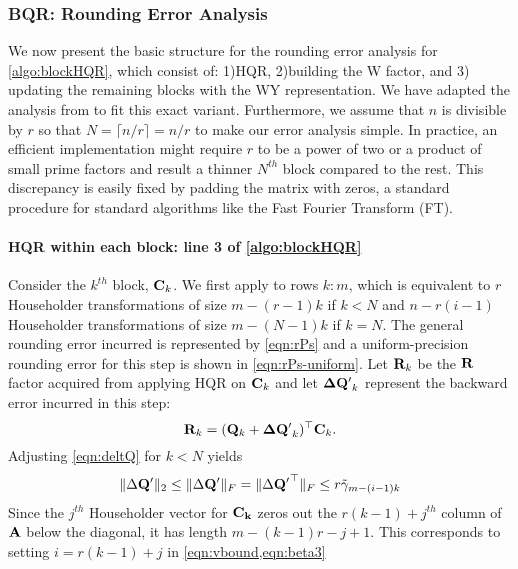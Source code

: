 \subsubsection{BQR: Rounding Error Analysis}
We now present the basic structure for the rounding error analysis for \cref{algo:blockHQR}, which consist of: 1)HQR, 2)building the W factor, and 3) updating the remaining blocks with the WY representation.
We have adapted the analysis from \cite{Higham2002} to fit this exact variant.
Furthermore, we assume that $n$ is divisible by $r$ so that $N= \lceil n/r\rceil =n/r$ to make our error analysis simple.
In practice, an efficient implementation might require $r$ to be a power of two or a product of small prime factors and result a thinner $N^{th}$ block compared to the rest. 
This discrepancy is easily fixed by padding the matrix with zeros, a standard procedure for standard algorithms like the Fast Fourier Transform (FT).
\paragraph{HQR within each block: line 3 of \cref{algo:blockHQR}}
Consider the $k^{th}$ block, $\mathbf{C}_k$. 
We first apply  to rows $k:m$, which is equivalent to $r$ Householder transformations of size $m-(r-1)k$ if $k < N$ and $n-r(i-1)$ Householder transformations of size $m-(N-1)k$ if $k=N$. 
The general rounding error incurred is represented by \cref{eqn:rPs} and a uniform-precision rounding error for this step is shown in \cref{eqn:rPs-uniform}.
Let $\mathbf{R}_k$ be the $\mathbf{R}$ factor acquired from applying HQR on $\mathbf{C}_k$ and let $\mathbf{\Delta Q'}_k$ represent the backward error incurred in this step:
\begin{equation*}
	\mathbf{R}_k = (\mathbf{Q}_k+\mathbf{\Delta Q'}_k)^{\top}\mathbf{C}_k.
\end{equation*}
Adjusting \cref{eqn:deltQ} for $k<N$ yields
\begin{equation}
\|\Delta \bb{Q'}\|_2\leq \|\Delta \bb{Q'}\|_F = \|\Delta \bb{Q'}^{\top}\|_F\leq r \tilde{\gamma}_{m-(i-1)k} \label{eqn:deltQBQR}
\end{equation}
Since the $j^{th}$ Householder vector for $\mathbf{C_k}$ zeros out the $r(k-1)+j^{th}$ column of $\mathbf{A}$ below the diagonal, it has length  $m -(k-1)r-j+1$. 
This corresponds to setting $i=r(k-1)+j$ in \cref{eqn:vbound,eqn:beta3}
